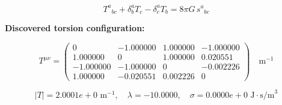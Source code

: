
\begin{equation}
  T^a{}_{bc} + \delta^a_b T_c - \delta^a_c T_b = 8\pi G \, s^a{}_{bc}
\end{equation}

\textbf{Discovered torsion configuration:}

\begin{equation}
  T^{\mu\nu} = \begin{pmatrix}
    0 & -1.000000 & 1.000000 & -1.000000 \\
    1.000000 & 0 & 1.000000 & 0.020551 \\
    -1.000000 & -1.000000 & 0 & -0.002226 \\
    1.000000 & -0.020551 & 0.002226 & 0
  \end{pmatrix} \quad \text{m}^{-1}
\end{equation}

\begin{equation}
  |T| = 2.0001e+0 \text{ m}^{-1}, \quad
  \lambda = -10.0000, \quad
  \sigma = 0.0000e+0 \text{ J}\cdot\text{s/m}^3
\end{equation}